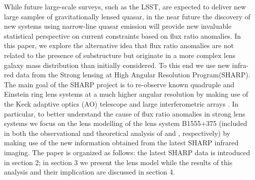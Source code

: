 \documentclass[manuscript]{emulateapj}
\newcommand{\simona}[1]{\textcolor{simonacolor}{#1}}
\begin{document}
While future large-scale surveys, such as the LSST, \simona{are expected to deliver new large samples of gravitationally lensed quasar, in the near future the discovery of new systems using} narrow-line quasar emission \citep{N14} \simona{will provide new invaluable statistical perspective on current constraints based on flux ratio anomalies. 
In this paper, we explore the alternative idea that flux ratio anomalies are not related to the presence of substructure but originate in a more complex lens galaxy mass distribution than initially considered. To this end we use new infra-red data from the Strong lensing at High Angular Resolution Program(SHARP). The main goal of the SHARP} project \simona{is to re-observe} known quadruple and Einstein ring lens systems at a much higher angular resolution by making use of the Keck adaptive optics (AO) telescope and large interferometric arrays \citep{SHARP12,V12} . In particular, to better understand the cause of flux ratio anomalies in strong lens systems \simona{we focus on the lens modelling of the lens system B1555+375 (included in both the observational and theoretical analysis of  \citet{Dalal2002} and \citet{Xu14}, respectively) by making use of} the new information obtained from the latest SHARP infrared imaging. \simona{The paper is organized as follows: the latest SHARP data is introduced in section 2; in section 3 we present the lens model while the results of this analysis and their implication are discussed in section 4.}
\end{document}
